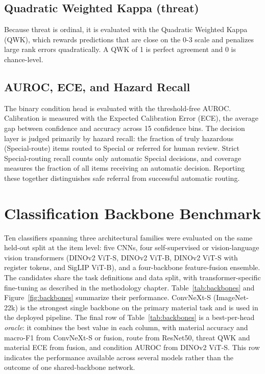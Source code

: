 \subsection{Quadratic Weighted Kappa (threat)}
Because threat is ordinal, it is evaluated with the Quadratic Weighted Kappa (QWK), which rewards predictions that are close on the 0-3 scale and penalizes large rank errors quadratically. A QWK of 1 is perfect agreement and 0 is chance-level.

\subsection{AUROC, ECE, and Hazard Recall}
The binary condition head is evaluated with the threshold-free AUROC. Calibration is measured with the Expected Calibration Error (ECE), the average gap between confidence and accuracy across 15 confidence bins. The decision layer is judged primarily by hazard recall: the fraction of truly hazardous (Special-route) items routed to Special or referred for human review. Strict Special-routing recall counts only automatic Special decisions, and coverage measures the fraction of all items receiving an automatic decision. Reporting these together distinguishes safe referral from successful automatic routing.

\section{Classification Backbone Benchmark}
Ten classifiers spanning three architectural families were evaluated on the same held-out split at the item level: five CNNs, four self-supervised or vision-language vision transformers (DINOv2 ViT-S, DINOv2 ViT-B, DINOv2 ViT-S with register tokens, and SigLIP ViT-B), and a four-backbone feature-fusion ensemble. The candidates share the task definitions and data split, with transformer-specific fine-tuning as described in the methodology chapter. Table~\ref{tab:backbones} and Figure~\ref{fig:backbones} summarize their performance. ConvNeXt-S (ImageNet-22k) is the strongest single backbone on the primary material task and is used in the deployed pipeline. The final row of Table~\ref{tab:backbones} is a best-per-head \emph{oracle}: it combines the best value in each column, with material accuracy and macro-F1 from ConvNeXt-S or fusion, route from ResNet50, threat QWK and material ECE from fusion, and condition AUROC from DINOv2 ViT-S. This row indicates the performance available across several models rather than the outcome of one shared-backbone network.

